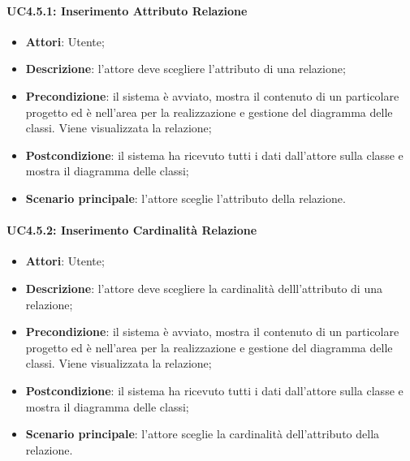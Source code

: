 \paragraph{UC4.5.1: Inserimento Attributo Relazione}
\label{UC4.5.1}
\begin{itemize}
	\item \textbf{Attori}: Utente;
	\item \textbf{Descrizione}: l'attore deve scegliere l'attributo di una relazione;
	\item \textbf{Precondizione}: il sistema è avviato, mostra il contenuto di un particolare progetto ed è nell'area per la realizzazione e gestione del diagramma delle classi. Viene visualizzata la relazione;
	\item \textbf{Postcondizione}: il sistema ha ricevuto tutti i dati dall'attore sulla classe e mostra il diagramma delle classi;
	\item \textbf{Scenario principale}: l'attore sceglie l'attributo della relazione.
\end{itemize}

\paragraph{UC4.5.2: Inserimento Cardinalità Relazione}
\label{UC4.5.2}
\begin{itemize}
	\item \textbf{Attori}: Utente;
	\item \textbf{Descrizione}: l'attore deve scegliere la cardinalità delll'attributo di una relazione;
	\item \textbf{Precondizione}: il sistema è avviato, mostra il contenuto di un particolare progetto ed è nell'area per la realizzazione e gestione del diagramma delle classi. Viene visualizzata la relazione;
	\item \textbf{Postcondizione}: il sistema ha ricevuto tutti i dati dall'attore sulla classe e mostra il diagramma delle classi;
	\item \textbf{Scenario principale}: l'attore sceglie la cardinalità dell'attributo della relazione.
\end{itemize}

